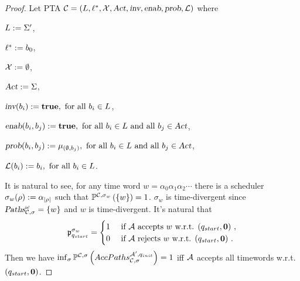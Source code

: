 \begin{proof}
Let PTA $\mathcal{C}=\left(L, \ell^*, \mathcal{X}, \mbox{\sl Act}, \mbox{\sl inv}, \mbox{\sl enab},  \mbox{\sl prob}, \mathcal{L}\right)$ where
\begin{compactitem}
    \item $L      :=  \Sigma'$, 
    \item $\ell^*     :=  b_{0} $, 
    \item $\mathcal{X}    :=  \emptyset $, 
    \item $\mbox{\sl Act}      :=  \Sigma $, 
    \item $\mbox{\sl inv}(b_{i})              :=  \mathbf{true}, 
                                            \text{ for all } 
                                            b_{i} \in L$,
    \item $\mbox{\sl enab}(b_{i},b_{j})   :=  \mathbf{true},
                                            \text{ for all } 
                                            b_{i} \in L 
                                            \text{ and all } 
                                            b_{j} \in \mbox{\sl Act}$,
    \item $\mbox{\sl prob}(b_{i},b_{j})   :=  \mu_{ \left (
                                                \emptyset,b_{j}
                                            \right)}, 
                                            \text{ for all } 
                                            b_{i} \in L 
                                            \text{ and all } 
                                            b_{j} \in \mbox{\sl Act}$,
    \item $\mathcal{L}(b_{i})           :=  b_{i},
                                            \text{ for all } b_{i} \in L$.
\end{compactitem}
It is natural to see, for any time word $ w = \alpha_0 \alpha_1 \alpha_2 \cdots $
there is a scheduler $ \sigma_w (\rho ) := \alpha_{\left| \rho \right|} $ such that 
$
    \mathbb{P}^{\mathcal{C},\sigma_w }\left(
        \left \{
            w
        \right \}
    \right)
    = 1
$.
$ \sigma_w $ is time-divergent since $\mbox{\sl Paths}^\omega_{\mathcal{C},\sigma} = \{ w \}$ and $w$ is time-divergent.
It's natural that
$$
    \mathfrak{p}_{q_{start}}^{\sigma_w}
        =   \begin{cases}
            1 & \mbox{ if $\mathcal{A}$ accepts $w$ w.r.t. $(q_{start},\mathbf{0})$ },\\
            0 & \mbox{ if $\mathcal{A}$ rejects $w$ w.r.t. $(q_{start},\mathbf{0})$ }.
        \end{cases}
$$
Then we have
$
\inf_\sigma \mathbb{P}^{\mathcal{C},\sigma}\left(
    AccPaths _{\mathcal{C},\sigma} ^{\mathcal{A}',q_{init }}
\right)
    = 1
$
iff
$\mathcal{A}$ accepts all timewords w.r.t. $(q_{start},\mathbf{0})$.
\end{proof}
